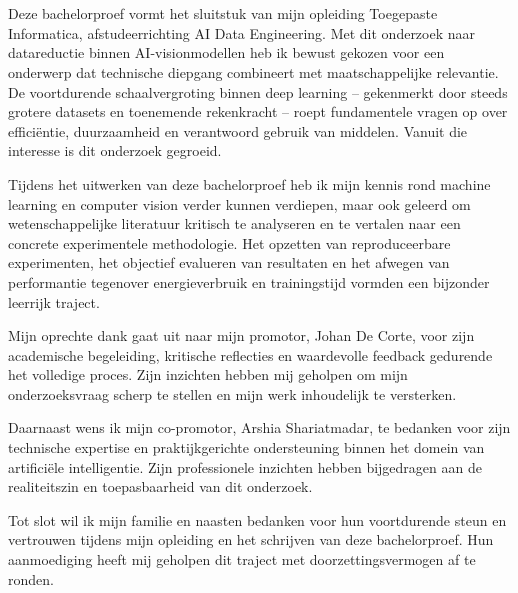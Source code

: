 \chapter*{}%
\label{ch:voorwoord}

Deze bachelorproef vormt het sluitstuk van mijn opleiding Toegepaste Informatica, afstudeerrichting AI Data Engineering. Met dit onderzoek naar datareductie binnen AI-visionmodellen heb ik bewust gekozen voor een onderwerp dat technische diepgang combineert met maatschappelijke relevantie. De voortdurende schaalvergroting binnen deep learning – gekenmerkt door steeds grotere datasets en toenemende rekenkracht – roept fundamentele vragen op over efficiëntie, duurzaamheid en verantwoord gebruik van middelen. Vanuit die interesse is dit onderzoek gegroeid.

Tijdens het uitwerken van deze bachelorproef heb ik mijn kennis rond machine learning en computer vision verder kunnen verdiepen, maar ook geleerd om wetenschappelijke literatuur kritisch te analyseren en te vertalen naar een concrete experimentele methodologie. Het opzetten van reproduceerbare experimenten, het objectief evalueren van resultaten en het afwegen van performantie tegenover energieverbruik en trainingstijd vormden een bijzonder leerrijk traject.

Mijn oprechte dank gaat uit naar mijn promotor, Johan De Corte, voor zijn academische begeleiding, kritische reflecties en waardevolle feedback gedurende het volledige proces. Zijn inzichten hebben mij geholpen om mijn onderzoeksvraag scherp te stellen en mijn werk inhoudelijk te versterken.

Daarnaast wens ik mijn co-promotor, Arshia Shariatmadar, te bedanken voor zijn technische expertise en praktijkgerichte ondersteuning binnen het domein van artificiële intelligentie. Zijn professionele inzichten hebben bijgedragen aan de realiteitszin en toepasbaarheid van dit onderzoek.

Tot slot wil ik mijn familie en naasten bedanken voor hun voortdurende steun en vertrouwen tijdens mijn opleiding en het schrijven van deze bachelorproef. Hun aanmoediging heeft mij geholpen dit traject met doorzettingsvermogen af te ronden.